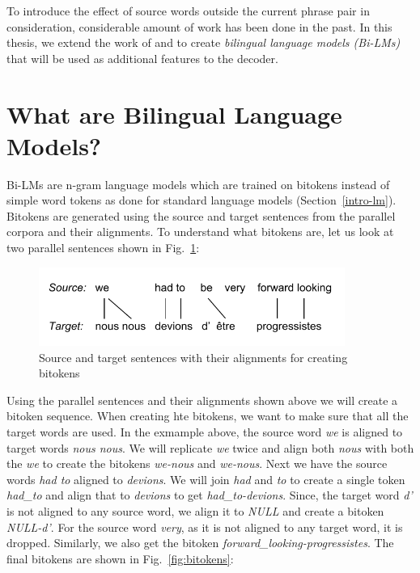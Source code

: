 To introduce the effect of source words outside the current phrase pair in consideration, considerable amount of work has been done in the past. In this thesis, we extend the work of \cite{Niehues2011} and \cite{Stewart2014} to create \textit{bilingual language models (Bi-LMs)} that will be used as additional features to the decoder.

\section{What are Bilingual Language Models?}
Bi-LMs are n-gram language models which are trained on bitokens instead of simple word tokens as done for standard language models (Section~\ref{intro-lm}). Bitokens are generated using the source and target sentences from the parallel corpora and their alignments. To understand what bitokens are, let us look at two parallel sentences shown in Fig.~\ref{fig:bitoken-sentences}:

\begin{figure}[htbp]
	\begin{center}
		\includegraphics[width=10cm]{files/images/bitoken-example}
	\end{center}
	\caption{Source and target sentences with their alignments for creating bitokens \cite{Stewart2014}}
	\label{fig:bitoken-sentences}
\end{figure}

Using the parallel sentences and their alignments shown above we will create a bitoken sequence. When creating hte bitokens, we want to make sure that all the target words are used. In the exmample above, the source word \textit{we} is aligned to target words \textit{nous nous}. We will replicate \textit{we} twice and align both \textit{nous} with both the \textit{we} to create the bitokens \textit{we-nous} and \textit{we-nous}. Next we have the source words \textit{had to} aligned to \textit{devions}. We will join \textit{had} and \textit{to} to create a single token \textit{had\_to} and align that to \textit{devions} to get \textit{had\_to-devions}. Since, the target word \textit{d'} is not aligned to any source word, we align it to \textit{NULL} and create a bitoken \textit{NULL-d'}. For the source word \textit{very}, as it is not aligned to any target word, it is dropped. Similarly, we also get the bitoken \textit{forward\_looking-progressistes}. The final bitokens are shown in Fig.~\ref{fig:bitokens}:

